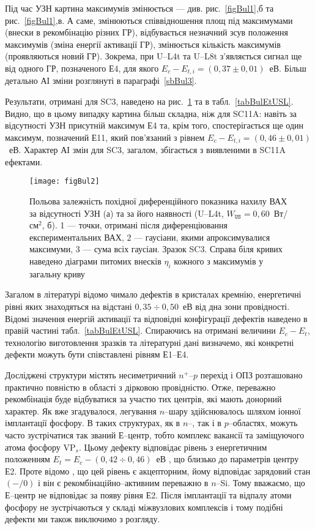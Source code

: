 Під час УЗН картина максимумів змінюється --- див. рис.~\ref{figBul1},б та рис.~\ref{figBul1},в.
А саме, змінюються співвідношення площ під максимумами (внески в рекомбінацію різних ГР),
відбувається незначний зсув положення максимумів (зміна енергії активації ГР),
змінюється кількість максимумів (проявляються новий ГР).
Зокрема, при U--L4t та U--L8t з'являється сигнал ще від одного ГР,
позначеного Е4, для якого $E_c-E_{t,i}=(0,37\pm0,01)$~еВ.
Більш детально АІ зміни розглянуті в параграфі~\ref{sbBul3}.


Результати, отримані для SC3, наведено на рис.~\ref{figBul2} та в табл.~\ref{tabBulEtUSL}.
Видно, що в цьому випадку картина більш складна, ніж для SC11A:
навіть за відсутності УЗН присутній максимум Е4 та, крім того,
спостерігається ще один максимум, позначений Е11, який пов'язаний з рівнем $E_c-E_{t,i}=(0,46\pm0,01)$~еВ.
Характер АІ змін для SC3, загалом, збігається з виявленими в SC11A ефектами.




\begin{figure}
\center
\texttt{[image: figBul2]}
\caption{\label{figBul2}
Польова залежність похідної диференційного показника нахилу ВАХ за відсутності УЗН (а)
та за його наявності (U--L4t,  $W_\mathtt{US}=0,60$~Вт/см$^2$, б).
1 --- точки, отримані після диференціювання експериментальних ВАХ,
2 --- гаусіани, якими апроксимувалися максимуми,
3 --- сума всіх гаусіан.
Зразок SC3.
Справа біля кривих наведено діаграми питомих внесків $\eta_i$ кожного з максимумів у загальну криву
}%
\end{figure}

Загалом в літературі відомо чимало дефектів в кристалах кремнію, енергетичні рівні яких знаходяться на відстані
$0,35\div0,50$~еВ від дна зони провідності.
Відомі значення енергій активації та відповідні конфігурації дефектів наведено в правій частині табл.~\ref{tabBulEtUSL}.
Спираючись на отримані величини $E_c-E_t$, технологію виготовлення зразків та літературні дані
визначемо, які конкретні дефекти можуть бути співставлені рівням Е1--Е4.

Досліджені структури містять несиметричний $n^+$--$p$ перехід і ОПЗ розташовано практично повністю в області з дірковою провідністю.
Отже, переважно рекомбінація буде відбуватися за участю тих центрів, які мають донорний характер.
Як вже згадувалося, легування $n$--шару здійснювалось шляхом іонної імплантації фосфору.
В таких структурах, як в $n$--, так і в $p$--областях, можуть часто зустрічатися так званий Е--центр,
тобто комплекс вакансії та заміщуючого атома фосфору VP$_s$.
Цьому дефекту відповідає  рівень з енергетичним положенням $E_t=E_c-(0,42\div0,46)$~еВ \cite{VI:Luc,Karazh,Kuchinskii,Ecentre:2005}, що близько до параметрів центру Е2.
Проте відомо \cite{Kuchinskii,Ecentre:2005}, що цей рівень є акцепторним, йому відповідає зарядовий стан  $(-/0)$ і він є рекомбінаційно--активним переважно в $n$--Si.
Тому вважаємо, що Е--центр не відповідає за появу рівня Е2.
Після імплантації та відпалу атоми фосфору не зустрічаються у складі міжвузлових комплексів \cite{ChelyadFTT} і тому подібні дефекти ми також виключимо з розгляду.

